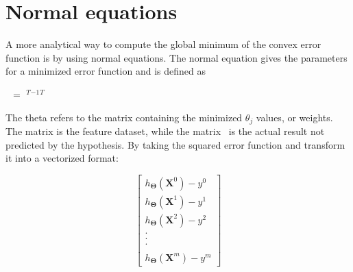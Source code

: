 \documentclass[a4paper,12pt]{article}
\begin{document}
\section{Normal equations}
A more analytical way to compute the global minimum of the convex error function is by using normal equations. The normal equation gives the parameters for a minimized error function and is defined as
\begin{center}
\boldmath{$\Theta $}\unboldmath \ $=$ \unboldmath$^T$\unboldmath$^{-1}$\unboldmath$^T$\unboldmath
\end{center}
The theta refers to the matrix containing the minimized \(\theta_j\) values, or weights. The matrix \unboldmath is the feature dataset, while the matrix \unboldmath \ is the actual result not predicted by the hypothesis. By taking the squared error function and transform it into a vectorized format:

\[\begin{bmatrix} h_{\boldsymbol{\Theta}} (\boldsymbol{X}^0) - y^0 \\ h_{\boldsymbol{\Theta}} (\boldsymbol{X}^1) - y^1 \\ h_{\boldsymbol{\Theta}} (\boldsymbol{X}^2) - y^2 \\ . \\ . \\ . \\  \\ h_{\boldsymbol{\Theta}} (\boldsymbol{X}^m) - y^m\end{bmatrix}\]
\end{document}
